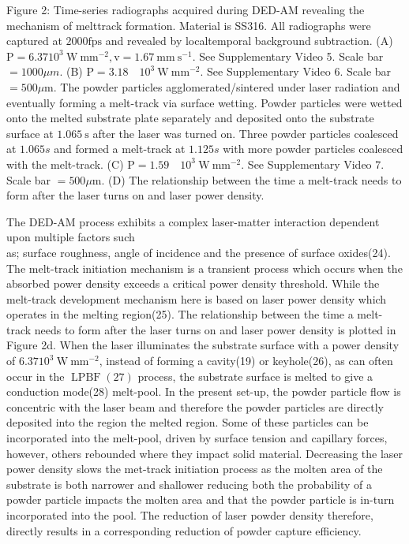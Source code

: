 \documentclass[10pt]{article}
\begin{document}
Figure 2: Time-series radiographs acquired during DED-AM revealing the mechanism of melttrack formation. Material is SS316. All radiographs were captured at $2000 \mathrm{fps}$ and revealed by localtemporal background subtraction. (A) $\mathrm{P}=6.3710^{3} \mathrm{~W} \mathrm{~mm}^{-2}, \mathrm{v}=1.67 \mathrm{~mm} \mathrm{~s}^{-1}$. See Supplementary Video 5. Scale bar $=1000 \mu m$. (B) $\mathrm{P}=3.18 \quad 10^{3} \mathrm{~W} \mathrm{~mm}^{-2}$. See Supplementary Video 6. Scale bar $=500 \mu \mathrm{m}$. The powder particles agglomerated/sintered under laser radiation and eventually forming a melt-track via surface wetting. Powder particles were wetted onto the melted substrate plate separately and deposited onto the substrate surface at $1.065 \mathrm{~s}$ after the laser was turned on. Three powder particles coalesced at $1.065 s$ and formed a melt-track at $1.125 s$ with more powder particles coalesced with the melt-track. (C) $\mathrm{P}=1.59 \quad 10^{3} \mathrm{~W} \mathrm{~mm}^{-2}$. See Supplementary Video 7. Scale bar $=500 \mu \mathrm{m}$. (D) The relationship between the time a melt-track needs to form after the laser turns on and laser power density.

The DED-AM process exhibits a complex laser-matter interaction dependent upon multiple factors such\\
as; surface roughness, angle of incidence and the presence of surface oxides(24). The melt-track initiation mechanism is a transient process which occurs when the absorbed power density exceeds a critical power density threshold. While the melt-track development mechanism here is based on laser power density which operates in the melting region(25). The relationship between the time a melt-track needs to form after the laser turns on and laser power density is plotted in Figure 2d. When the laser illuminates the substrate surface with a power density of $6.3710^{3} \mathrm{~W} \mathrm{~mm}^{-2}$, instead of forming a cavity(19) or keyhole(26), as can often occur in the $\operatorname{LPBF}(27)$ process, the substrate surface is melted to give a conduction mode(28) melt-pool. In the present set-up, the powder particle flow is concentric with the laser beam and therefore the powder particles are directly deposited into the region the melted region. Some of these particles can be incorporated into the melt-pool, driven by surface tension and capillary forces, however, others rebounded where they impact solid material. Decreasing the laser power density slows the met-track initiation process as the molten area of the substrate is both narrower and shallower reducing both the probability of a powder particle impacts the molten area and that the powder particle is in-turn incorporated into the pool. The reduction of laser powder density therefore, directly results in a corresponding reduction of powder capture efficiency.
\end{document}
